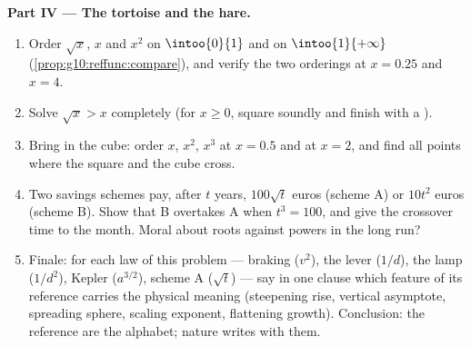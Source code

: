 \begin{problem}
\medskip
\noindent\textbf{Part IV --- The tortoise and the hare.}
\begin{enumerate}[resume]
  \item Order $\sqrt x$, $x$ and $x^2$ on $\intoo{0}{1}$ and on
        $\intoo{1}{+\infty}$
        (\cref{prop:g10:reffunc:compare}), and verify the two
        orderings at $x = 0.25$ and $x = 4$.
  \item Solve $\sqrt x > x$ completely (for $x \geq 0$, square
        soundly and finish with a ).
  \item Bring in the cube: order $x$, $x^2$, $x^3$ at
        $x = 0.5$ and at $x = 2$, and find all points where the
        square and the cube  cross.
  \item Two savings schemes pay, after $t$ years, $100\sqrt t$
        euros (scheme A) or $10 t^2$ euros (scheme B). Show that
        B overtakes A when $t^3 = 100$, and give the crossover
        time to the month. Moral about roots against powers in
        the long run?
  \item Finale: for each law of this problem --- braking
        ($v^2$), the lever ($1/d$), the lamp ($1/d^2$), Kepler
        ($a^{3/2}$), scheme A ($\sqrt t$) --- say in one clause
        which feature of its reference  carries the
        physical meaning (steepening rise, vertical asymptote,
        spreading sphere, scaling exponent, flattening growth).
        Conclusion: the reference  are the alphabet;
        nature writes with them.
\end{enumerate}
\end{problem}
